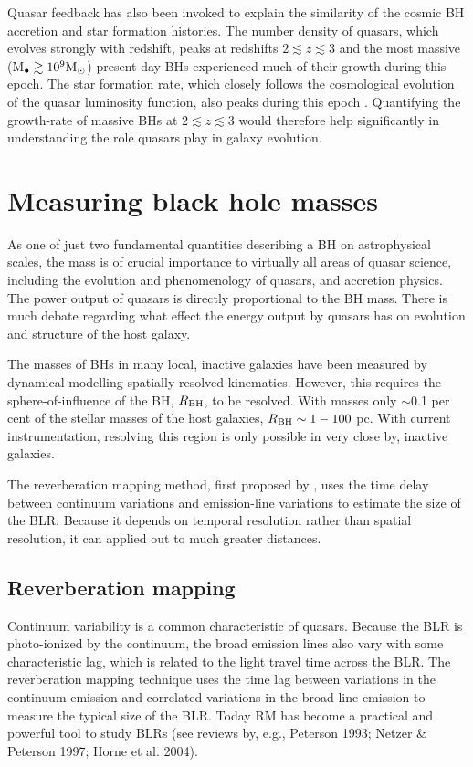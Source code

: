 Quasar feedback has also been invoked to explain the similarity of the cosmic BH accretion and star formation histories.
The number density of quasars, which evolves strongly with redshift, peaks at redshifts $2 \lesssim z \lesssim 3$ \citep[e.g.][]{brandt05,richards06b} and the most massive (M$_\bullet \gtrsim 10^9{{{\rm M_\odot}}}$) present-day BHs experienced much of their growth during this epoch.  
The star formation rate, which closely follows the cosmological evolution of the quasar luminosity function, also peaks during this epoch \citep[e.g.][]{boyle98}. 
Quantifying the growth-rate of massive BHs at $2 \lesssim z \lesssim 3$ would therefore help significantly in understanding the role quasars play in galaxy evolution.

\section{Measuring black hole masses}

As one of just two fundamental quantities describing a BH on astrophysical scales, the mass is of crucial importance to virtually all areas of quasar science, including the evolution and phenomenology of quasars, and accretion physics.
The power output of quasars is directly proportional to the BH mass. 
There is much debate regarding what effect the energy output by quasars has on evolution and structure of the host galaxy. 

The masses of BHs in many local, inactive galaxies have been measured by dynamical modelling spatially resolved kinematics. 
However, this requires the sphere-of-influence of the BH, $R_{\rm BH}$, to be resolved. 
With masses only $\sim$0.1 per cent of the stellar masses of the host galaxies, $R_{\rm BH}\sim1-100$ pc.
With current instrumentation, resolving this region is only possible in very close by, inactive galaxies. 

The reverberation mapping method, first proposed by \citet{blandford82a}, uses the time delay between continuum variations and emission-line variations to estimate the size of the BLR. 
Because it depends on temporal resolution rather than spatial resolution, it can applied out to much greater distances. 

\subsection{Reverberation mapping}


Continuum variability is a common characteristic of quasars. 
Because the BLR is photo-ionized by the continuum, the broad emission lines also vary with some characteristic lag, which is related to the light travel time across the BLR. 
The reverberation mapping technique uses the time lag between variations in the continuum emission and correlated variations in the broad line emission to measure the typical size of the BLR. 
Today RM has become a practical and powerful tool to study BLRs (see reviews by, e.g., Peterson 1993; Netzer \& Peterson 1997; Horne et al. 2004). 

